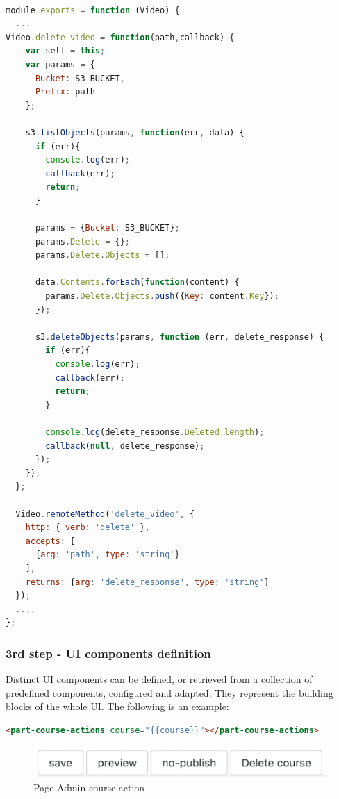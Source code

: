 \begin{lstlisting}[language=javascript]

module.exports = function (Video) {
  ...
Video.delete_video = function(path,callback) {
    var self = this;
    var params = {
      Bucket: S3_BUCKET,
      Prefix: path
    };

    s3.listObjects(params, function(err, data) {
      if (err){
        console.log(err);
        callback(err);
        return;
      } 

      params = {Bucket: S3_BUCKET};
      params.Delete = {};
      params.Delete.Objects = [];

      data.Contents.forEach(function(content) {
        params.Delete.Objects.push({Key: content.Key});
      });

      s3.deleteObjects(params, function (err, delete_response) {
        if (err){
          console.log(err);
          callback(err);
          return;
        }

        console.log(delete_response.Deleted.length);
        callback(null, delete_response);
      });
    });
  };

  Video.remoteMethod('delete_video', {
    http: { verb: 'delete' },
    accepts: [
      {arg: 'path', type: 'string'}
    ],
    returns: {arg: 'delete_response', type: 'string'}
  });
  ....
};
\end{lstlisting}

\subsubsection {3rd step - UI components definition}
\label{subsec:3rd_step_UI_components_definition}

Distinct UI components can be defined, or retrieved from a collection of predefined components, configured and adapted. They represent the building blocks of the whole UI.
{\color{red}The following is an example:}

\begin{lstlisting}[language=html]
<part-course-actions course="{{course}}"></part-course-actions>
\end{lstlisting}

\begin{figure}[htb] %
 \centering
 \includegraphics[width=1.0\linewidth]{images/chapter3/admin-course-actions.png}\hfill
 \caption[Page Admin course action]{Page Admin course action}
 \label{fig:fourV}
\end{figure}


